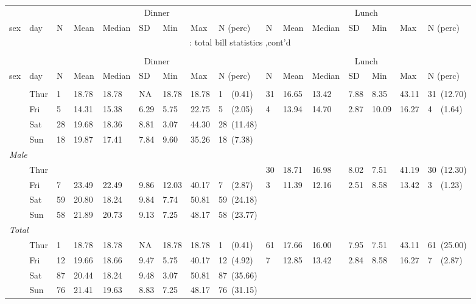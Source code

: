 \documentclass[8pt]{beamer}
\begin{document}
\begin{frame}
\hypertarget{total bill statistics}{} 
\begin{longtable}{llllllllllllllll}
\toprule
&&
\multicolumn{7}{c}{Dinner}&\multicolumn{7}{c}{Lunch} \\
\cmidrule(lr){3-9} \cmidrule(lr){10-16}
sex & day & N & Mean & Median & SD & Min & Max & N (perc) & N & Mean & Median & SD & Min & Max & N (perc) \\
\hline
\endfirsthead
\multicolumn{16}{c}{\tablename~\thetable{}: total bill statistics ,cont'd}\\\\
\toprule
&&
\multicolumn{7}{c}{Dinner}&\multicolumn{7}{c}{Lunch} \\
\cmidrule(lr){3-9} \cmidrule(lr){10-16}
sex & day & N & Mean & Median & SD & Min & Max & N (perc) & N & Mean & Median & SD & Min & Max & N (perc) \\
\hline
\endhead \hline \endfoot \hline

\endlastfoot
\multicolumn{ 15 }{l}{\textit{ Female }}\\
& Thur & 1 & 18.78 & 18.78 &  NA & 18.78 & 18.78 & 1~~(0.41) & 31 & 16.65 & 13.42 & 7.88 & 8.35 & 43.11 & 31~(12.70) \\
 & Fri & 5 & 14.31 & 15.38 & 6.29 & 5.75 & 22.75 & 5~~(2.05) & 4 & 13.94 & 14.70 & 2.87 & 10.09 & 16.27 & 4~~(1.64) \\
 & Sat & 28 & 19.68 & 18.36 & 8.81 & 3.07 & 44.30 & 28~(11.48) &  &  &  &  &  &  &  \\
 & Sun & 18 & 19.87 & 17.41 & 7.84 & 9.60 & 35.26 & 18~(7.38) &  &  &  &  &  &  &  \\
\multicolumn{ 15 }{l}{\textit{ Male }}\\
& Thur &  &  &  &  &  &  &  & 30 & 18.71 & 16.98 & 8.02 & 7.51 & 41.19 & 30~(12.30) \\
 & Fri & 7 & 23.49 & 22.49 & 9.86 & 12.03 & 40.17 & 7~~(2.87) & 3 & 11.39 & 12.16 & 2.51 & 8.58 & 13.42 & 3~~(1.23) \\
 & Sat & 59 & 20.80 & 18.24 & 9.84 & 7.74 & 50.81 & 59~(24.18) &  &  &  &  &  &  &  \\
 & Sun & 58 & 21.89 & 20.73 & 9.13 & 7.25 & 48.17 & 58~(23.77) &  &  &  &  &  &  &  \\
\multicolumn{ 15 }{l}{\textit{ Total }}\\
& Thur & 1 & 18.78 & 18.78 &  NA & 18.78 & 18.78 & 1~~(0.41) & 61 & 17.66 & 16.00 & 7.95 & 7.51 & 43.11 & 61~(25.00) \\
 & Fri & 12 & 19.66 & 18.66 & 9.47 & 5.75 & 40.17 & 12~(4.92) & 7 & 12.85 & 13.42 & 2.84 & 8.58 & 16.27 & 7~~(2.87) \\
 & Sat & 87 & 20.44 & 18.24 & 9.48 & 3.07 & 50.81 & 87~(35.66) &  &  &  &  &  &  &  \\
 & Sun & 76 & 21.41 & 19.63 & 8.83 & 7.25 & 48.17 & 76~(31.15) &  &  &  &  &  &  &  \\
\end{longtable}
\end{frame}
\end{document}
